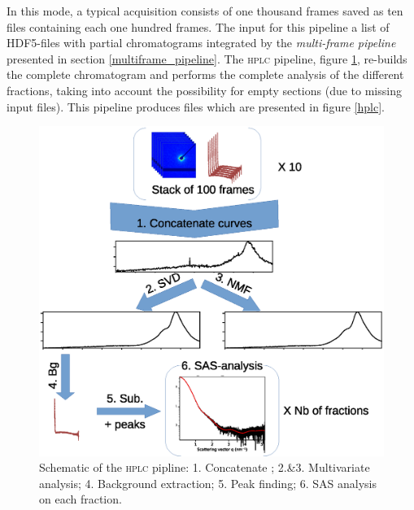 \documentclass[preprint]{iucr}              %
\begin{document}
In this mode, a typical acquisition consists of one thousand frames saved as ten files containing each one hundred frames.
The input for this pipeline a list of HDF5-files with partial chromatograms integrated by the \textit{multi-frame pipeline} presented in section \ref{multiframe_pipeline}. 
The \textsc{hplc} pipeline, figure \ref{hplc_worflow}, re-builds the complete chromatogram and performs the complete analysis of the different fractions, taking into account the possibility for empty sections (due to missing input files).
This pipeline produces files which are presented in figure \ref{hplc}.
\begin{figure}
    \label{hplc_worflow}
    \includegraphics[width=12cm]{HPLC_pipeline.eps}
    \caption{Schematic of the \textsc{hplc} pipline: 
    1. Concatenate ;
    2.\&3. Multivariate analysis;
    4. Background extraction;
    5. Peak finding;
    6. SAS analysis on each fraction.}
\end{figure}
\end{document}
